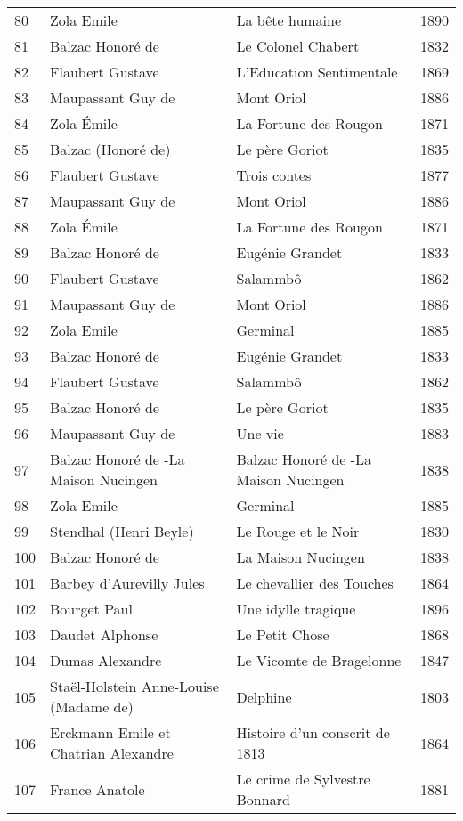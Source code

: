 \begin{center}
\begin{small}
\begin{longtable}{l l l l}
  80 & Zola Emile & La bête humaine & 1890 \\
  81 & Balzac Honoré de & Le Colonel Chabert & 1832 \\
  82 & Flaubert Gustave & L'Education Sentimentale & 1869 \\
  83 & Maupassant Guy de & Mont Oriol & 1886 \\
  84 & Zola Émile & La Fortune des Rougon & 1871 \\
  85 & Balzac (Honoré de) & Le père Goriot & 1835 \\
  86 & Flaubert Gustave & Trois contes & 1877 \\
  87 & Maupassant Guy de & Mont Oriol & 1886 \\
  88 & Zola Émile & La Fortune des Rougon & 1871 \\
  89 & Balzac Honoré de & Eugénie Grandet & 1833 \\
  90 & Flaubert Gustave & Salammbô & 1862 \\
  91 & Maupassant Guy de & Mont Oriol & 1886 \\
  92 & Zola Emile & Germinal & 1885 \\
  93 & Balzac Honoré de & Eugénie Grandet & 1833 \\
  94 & Flaubert Gustave & Salammbô & 1862 \\
  95 & Balzac Honoré de & Le père Goriot & 1835 \\
  96 & Maupassant Guy de & Une vie & 1883 \\
  97 & Balzac Honoré de -La Maison Nucingen & Balzac Honoré de -La Maison Nucingen & 1838 \\
  98 & Zola Emile & Germinal & 1885 \\
  99 & Stendhal (Henri Beyle) & Le Rouge et le Noir & 1830 \\
  100 & Balzac Honoré de & La Maison Nucingen & 1838 \\
  \midrule
  101 & Barbey d'Aurevilly Jules & Le chevallier des Touches & 1864 \\
  102 & Bourget Paul & Une idylle tragique & 1896 \\
  103 & Daudet Alphonse & Le Petit Chose & 1868 \\
  104 & Dumas Alexandre & Le Vicomte de Bragelonne & 1847 \\
  105 & Staël-Holstein Anne-Louise (Madame de) & Delphine & 1803 \\
  106 & Erckmann Emile et Chatrian Alexandre & Histoire d’un conscrit de 1813 & 1864 \\
  107 & France Anatole & Le crime de Sylvestre Bonnard & 1881 \\

\end{longtable}
\end{small}
\end{center}
